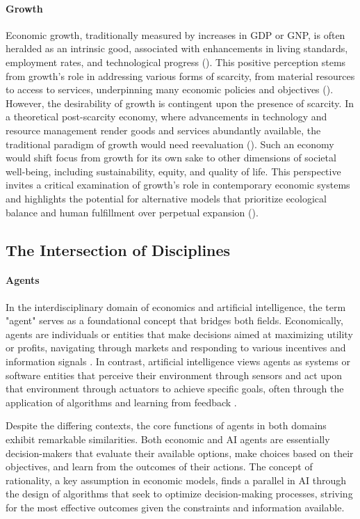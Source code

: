 \documentclass{article}
\begin{document}
\paragraph{Growth}
Economic growth, traditionally measured by increases in GDP or GNP, is often heralded as an intrinsic good, associated with enhancements in living standards, employment rates, and technological progress (\cite{textbookGrowth}). This positive perception stems from growth's role in addressing various forms of scarcity, from material resources to access to services, underpinning many economic policies and objectives (\cite{meadowsLimits}). However, the desirability of growth is contingent upon the presence of scarcity. In a theoretical post-scarcity economy, where advancements in technology and resource management render goods and services abundantly available, the traditional paradigm of growth would need reevaluation (\cite{bookchinPostScarcity}). Such an economy would shift focus from growth for its own sake to other dimensions of societal well-being, including sustainability, equity, and quality of life. This perspective invites a critical examination of growth's role in contemporary economic systems and highlights the potential for alternative models that prioritize ecological balance and human fulfillment over perpetual expansion (\cite{degrowthResearch}).


\subsection{The Intersection of Disciplines}

\paragraph{Agents}
In the interdisciplinary domain of economics and artificial intelligence, the term "agent" serves as a foundational concept that bridges both fields. Economically, agents are individuals or entities that make decisions aimed at maximizing utility or profits, navigating through markets and responding to various incentives and information signals \cite{mankiw_principles_2020}. In contrast, artificial intelligence views agents as systems or software entities that perceive their environment through sensors and act upon that environment through actuators to achieve specific goals, often through the application of algorithms and learning from feedback \cite{russell_artificial_2021}.

Despite the differing contexts, the core functions of agents in both domains exhibit remarkable similarities. Both economic and AI agents are essentially decision-makers that evaluate their available options, make choices based on their objectives, and learn from the outcomes of their actions. The concept of rationality, a key assumption in economic models, finds a parallel in AI through the design of algorithms that seek to optimize decision-making processes, striving for the most effective outcomes given the constraints and information available.
\end{document}
